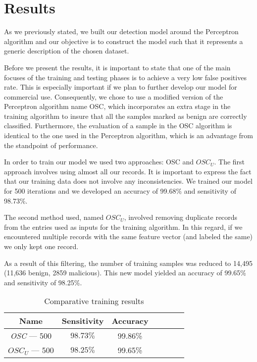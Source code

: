 \section{Results}
\par
As we previously stated, we built our detection model around the Perceptron algorithm and our objective is to construct the model such that it represents a generic description of the chosen dataset.
\par
Before we present the results, it is important to state that one of the main focuses of the training and testing phases is to achieve a very low false positives rate. This is especially important if we plan to further develop our model for commercial use. Consequently, we chose to use a modified version of the Perceptron algorithm name OSC, which incorporates an extra stage in the training algorithm to insure that all the samples marked as benign are correctly classified. Furthermore, the evaluation of a sample in the OSC algorithm is identical to the one used in the Perceptron algorithm, which is an advantage from the standpoint of performance.
\par
In order to train our model we used two approaches: OSC and $OSC_{U}$. The first approach involves using almost all our records. It is important to express the fact that our training data does not involve any inconsistencies. We trained our model for 500 iterations and we developed an accuracy of 99.68\% and sensitivity of 98.73\%. 
\par
The second method used, named $OSC_{U}$,  involved removing duplicate records from the entries used as inputs for the training algorithm. In this regard, if we encountered multiple records with the same feature vector (and labeled the same) we only kept one record.
\par
As a result of this filtering, the number of training samples was reduced to 14,495 (11,636 benign, 2859 malicious). This new model yielded an accuracy of 99.65\% and sensitivity of 98.25\%.
\begin{table}[ht]
    \centering
    \begin{tabular}{| c | c | c | c | c | c | c | }
    \hline
    Name & Sensitivity & Accuracy\\ \hline
    \textit{OSC} --- 500 & $98.73\%$ &  99.86\% \\ \hline
    \textit{$OSC_{U}$} --- 500 & $98.25\%$ &  99.65\% \\ \hline
    \end{tabular}
    \caption{Comparative training results} 
    \label{tab:trainingresults}
\end{table}
